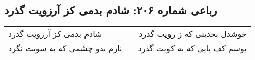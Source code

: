 \begin{center}
\section*{رباعی شماره ۲۰۶: شادم بدمی کز آرزویت گذرد}
\label{sec:sh206}
\begin{longtable}{l p{0.5cm} r}
شادم بدمی کز آرزویت گذرد
&&
خوشدل بحدیثی که ز رویت گذرد
\\
نازم بدو چشمی که به سویت نگرد
&&
بوسم کف پایی که به کویت گذرد
\\
\end{longtable}
\end{center}
